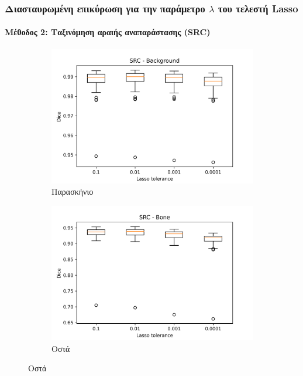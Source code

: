 \documentclass{beamer}
\begin{document}
\begin{frame}
\frametitle{Διασταυρωμένη επικύρωση για την παράμετρο $\lambda$ του τελεστή
Lasso}
\framesubtitle{Μέθοδος 2: Ταξινόμηση αραιής αναπαράστασης (SRC)}

\begin{figure}[H]
    \centering

    \begin{subfigure}[b]{0.42\linewidth}
    \includegraphics[width=\linewidth]{SRC_Lasso_tolerance_Background_plot.png}
    \caption{Παρασκήνιο}
    \end{subfigure}
    \begin{subfigure}[b]{0.42\linewidth}
    \includegraphics[width=\linewidth]{SRC_Lasso_tolerance_Bone_plot.png}
    \caption{Οστά}
    \end{subfigure}


\end{figure}
\end{frame}
\end{document}
